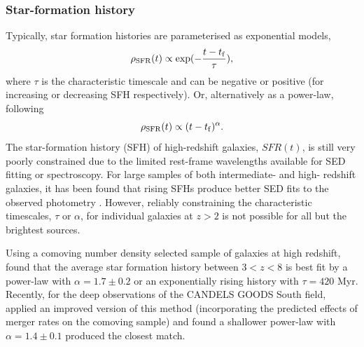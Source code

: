 \subsubsection{Star-formation history}\label{reion-sec:sfh}
Typically, star formation histories are parameterised as exponential models,
\begin{equation}
    \rho_{\rm{SFR}}(t) \propto \exp(-\frac{t - t_{\rm{f}}}{\tau}),
\end{equation}
where $\tau$ is the characteristic timescale and can be negative or positive (for increasing or decreasing SFH respectively). Or, alternatively as a power-law, following
\begin{equation}
    \rho_{\rm{SFR}}(t) \propto ({t - t_{\rm{f}}})^{\alpha}.
\end{equation}
The star-formation history (SFH) of high-redshift galaxies, $SFR(t)$, is still very poorly constrained due to the limited rest-frame wavelengths available for SED fitting or spectroscopy. For large samples of both intermediate- and high- redshift galaxies, it has been found that rising SFHs produce better SED fits to the observed photometry \citep{Maraston:2010dl,Lee:2014in}. However, reliably constraining the characteristic timescales, $\tau$ or $\alpha$, for individual galaxies at $z > 2$ is not possible for all but the brightest sources.

Using a comoving number density selected sample of galaxies at high redshift, \citet{2011MNRAS.412.1123P} found that the average star formation history between $3 < z < 8$ is best fit by a power-law with $\alpha = 1.7 \pm 0.2$ or an exponentially rising history with $\tau = 420$ Myr. Recently, for the deep observations of the CANDELS GOODS South field, \citet{2015ApJ...799..183S} applied an improved version of this method (incorporating the predicted effects of merger rates on the comoving sample) and found a shallower power-law with $\alpha = 1.4 \pm 0.1$ produced the closest match.

